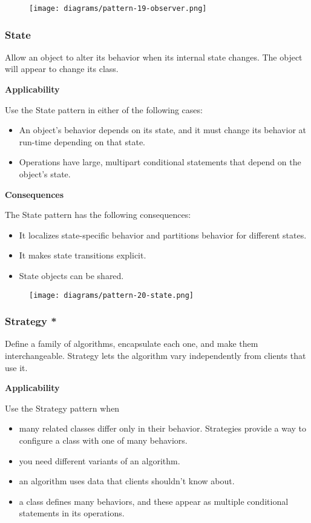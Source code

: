 \documentclass{article}
\begin{document}
\begin{figure}[h]
    \centering
    \texttt{[image: diagrams/pattern-19-observer.png]}
\end{figure}

\newpage
\subsubsection{State}
Allow an object to alter its behavior when its internal state changes. The object will appear to change its class.

\textbf{Applicability}

Use the State pattern in either of the following cases:

\begin{itemize}
    \item An object's behavior depends on its state, and it must change its behavior at run-time depending on that state. 
    \item Operations have large, multipart conditional statements that depend on the object's state. 
\end{itemize}

\textbf{Consequences}

The State pattern has the following consequences:
\begin{itemize}
    \item It localizes state-specific behavior and partitions behavior for different states.
    \item It makes state transitions explicit.
    \item State objects can be shared.
\end{itemize}

\begin{figure}[h]
    \centering
    \texttt{[image: diagrams/pattern-20-state.png]}
\end{figure}

\newpage
\subsubsection{Strategy *}
Define a family of algorithms, encapsulate each one, and make them
interchangeable. Strategy lets the algorithm vary independently from clients that use it.

\textbf{Applicability}

Use the Strategy pattern when

\begin{itemize}
    \item many related classes differ only in their behavior. Strategies provide a way to configure a class with one of many behaviors. 
    \item you need different variants of an algorithm. 
    \item an algorithm uses data that clients shouldn't know about.
    \item a class defines many behaviors, and these appear as multiple conditional statements in its operations.
\end{itemize}
\end{document}
